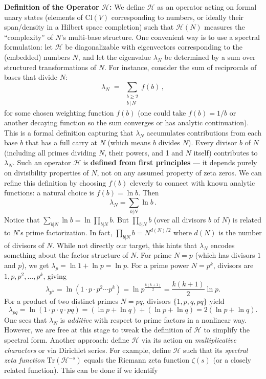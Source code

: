 \documentclass{article}
\begin{document}
\textbf{Definition of the Operator $\mathcal{H}$:} We define $\mathcal{H}$ as an operator acting on formal unary states (elements of $\mathrm{Cl}(V)$ corresponding to numbers, or ideally their span/density in a Hilbert space completion) such that $\mathcal{H}(N)$ measures the ``complexity'' of $N$'s multi-base structure. One convenient way is to use a spectral formulation: let $\mathcal{H}$ be diagonalizable with eigenvectors corresponding to the (embedded) numbers $N$, and let the eigenvalue $\lambda_N$ be determined by a sum over structured transformations of $N$. For instance, consider the sum of reciprocals of bases that divide $N$:
$$
\lambda_N \;=\; \sum_{\substack{b\ge 2 \\ b\,|\,N}} f(b)\,,
$$
for some chosen weighting function $f(b)$ (one could take $f(b)=1/b$ or another decaying function so the sum converges or has analytic continuation). This is a formal definition capturing that $\lambda_N$ accumulates contributions from each base $b$ that has a full carry at $N$ (which means $b$ divides $N$). Every divisor $b$ of $N$ (including all primes dividing $N$, their powers, and 1 and $N$ itself) contributes to $\lambda_N$. Such an operator $\mathcal{H}$ is \textbf{defined from first principles} --- it depends purely on divisibility properties of $N$, not on any assumed property of zeta zeros. We can refine this definition by choosing $f(b)$ cleverly to connect with known analytic functions: a natural choice is $f(b)=\ln b$. Then 
$$
\lambda_N = \sum_{b|N} \ln b\,.
$$
Notice that $\sum_{b|N}\ln b = \ln\prod_{b|N} b$. But $\prod_{b|N} b$ (over all divisors $b$ of $N$) is related to $N$'s prime factorization. In fact, $\prod_{b|N} b = N^{d(N)/2}$ where $d(N)$ is the number of divisors of $N$. While not directly our target, this hints that $\lambda_N$ encodes something about the factor structure of $N$. For prime $N=p$ (which has divisors $1$ and $p$), we get $\lambda_p = \ln 1 + \ln p = \ln p$. For a prime power $N=p^k$, divisors are $1,p,p^2,\dots,p^k$, giving 
$$
\lambda_{p^k} = \ln(1\cdot p\cdot p^2 \cdots p^k) = \ln p^{\frac{k(k+1)}{2}} = \frac{k(k+1)}{2}\ln p.
$$
For a product of two distinct primes $N= p q$, divisors $\{1,p,q,pq\}$ yield 
$$
\lambda_{pq} = \ln(1\cdot p\cdot q\cdot pq) = (\ln p+\ln q)+(\ln p+\ln q) = 2(\ln p + \ln q).
$$
One sees that $\lambda_N$ is \emph{additive} with respect to prime factors in a nonlinear way. However, we are free at this stage to tweak the definition of $\mathcal{H}$ to simplify the spectral form. Another approach: define $\mathcal{H}$ via its action on \emph{multiplicative characters} or via Dirichlet series. For example, define $\mathcal{H}$ such that its \emph{spectral zeta function} $\mathrm{Tr}(\mathcal{H}^{-s})$ equals the Riemann zeta function $\zeta(s)$ (or a closely related function). This can be done if we identify 
\end{document}
